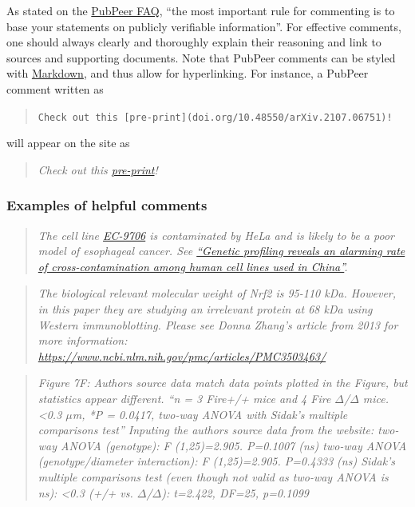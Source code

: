 \documentclass[letterpaper, 12pt]{article}
\begin{document}
As stated on the \href{https://pubpeer.com/static/faq#4}{PubPeer FAQ}, ``the most important rule for commenting is to base your statements on publicly verifiable information''. For effective comments, one should always clearly and thoroughly explain their reasoning and link to sources and supporting documents. Note that PubPeer comments can be styled with \href{https://pubpeer.com/static/markdown}{Markdown}, and thus allow for hyperlinking. For instance, a PubPeer comment written as
\begin{quote}
    \verb|Check out this [pre-print](doi.org/10.48550/arXiv.2107.06751)!|
\end{quote}

will appear on the site as

\begin{quote}
    \textit{Check out this \href{https://doi.org/10.48550/arXiv.2107.06751}{pre-print}!}
\end{quote}

\subsubsection*{Examples of helpful comments}

\begin{quote}
    \textit{The cell line \href{https://www.cellosaurus.org/CVCL_E307}{EC-9706} is contaminated by HeLa and is likely to be a poor model of esophageal cancer. See \href{https://faseb.onlinelibrary.wiley.com/doi/abs/10.1096/fj.14-266718}{``Genetic profiling reveals an alarming rate of cross-contamination among human cell lines used in China''}.}
\end{quote}

\begin{quote}
    \textit{The biological relevant molecular weight of Nrf2 is 95-110 kDa. However, in this paper they are studying an irrelevant protein at 68 kDa using Western immunoblotting. Please see Donna Zhang's article from 2013 for more information: \href{https://www.ncbi.nlm.nih.gov/pmc/articles/PMC3503463/}{https://www.ncbi.nlm.nih.gov/pmc/articles/PMC3503463/}}
\end{quote}

\begin{quote}
    \textit{
    Figure 7F: Authors source data match data points plotted in the Figure, but statistics appear different. “n = 3 Fire+/+ mice and 4 Fire $\Delta$/$\Delta$ mice. <0.3 $\mu$m, *P = 0.0417, two-way ANOVA with Sidak’s multiple comparisons test” Inputing the authors source data from the website: two-way ANOVA (genotype): F (1,25)=2.905. P=0.1007 (ns) two-way ANOVA (genotype/diameter interaction): F (1,25)=2.905. P=0.4333 (ns) Sidak’s multiple comparisons test (even though not valid as two-way ANOVA is ns): <0.3 (+/+ vs. $\Delta$/$\Delta$): t=2.422, DF=25, p=0.1099
}
\end{quote}
\end{document}
